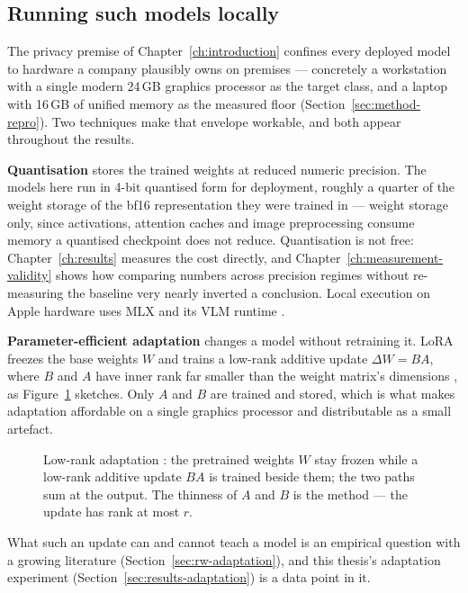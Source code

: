 \subsection{Running such models locally}
\label{sec:bg-local}

The privacy premise of Chapter~\ref{ch:introduction} confines every deployed model to
hardware a company plausibly owns on premises --- concretely a workstation with a single modern
24\,\ac{GB} graphics processor as the target class, and a laptop with 16\,\ac{GB} of unified
memory as the measured floor (Section~\ref{sec:method-repro}). Two techniques make that envelope
workable, and both appear throughout the results.

\textbf{Quantisation} stores the trained weights at reduced numeric precision. The
models here run in 4-bit quantised form for deployment, roughly a quarter of the weight
storage of the \ac{bf16} representation they were trained in --- weight storage
only, since activations, attention caches and image preprocessing consume memory a
quantised checkpoint does not reduce. Quantisation is not
free: Chapter~\ref{ch:results} measures the cost directly, and
Chapter~\ref{ch:measurement-validity} shows how comparing numbers across precision
regimes without re-measuring the baseline very nearly inverted a conclusion. Local
execution on Apple hardware uses \ac{MLX} and its \ac{VLM} runtime
\parencite{mlxvlm}.

\textbf{Parameter-efficient adaptation} changes a model without retraining it. \ac{LoRA}
freezes the base weights $W$ and trains a low-rank additive update $\Delta W = BA$,
where $B$ and $A$ have inner rank far smaller than the weight matrix's dimensions
\parencite{hu2021lora}, as Figure~\ref{fig:lora-update} sketches. Only $A$ and $B$ are
trained and stored, which is what makes
adaptation affordable on a single graphics processor and distributable as a small artefact.

\begin{figure}[htbp]
  \centering
  
  \caption[Low-rank adaptation]{Low-rank adaptation \parencite{hu2021lora}: the pretrained
  weights $W$ stay frozen while a low-rank additive update $BA$ is trained beside them;
  the two paths sum at the output. The thinness of $A$ and $B$ is the method --- the
  update has rank at most $r$.}
  \label{fig:lora-update}
\end{figure}

What such an update can and cannot teach a model is an empirical question with a growing
literature (Section~\ref{sec:rw-adaptation}), and this thesis's adaptation experiment
(Section~\ref{sec:results-adaptation}) is a data point in it.

